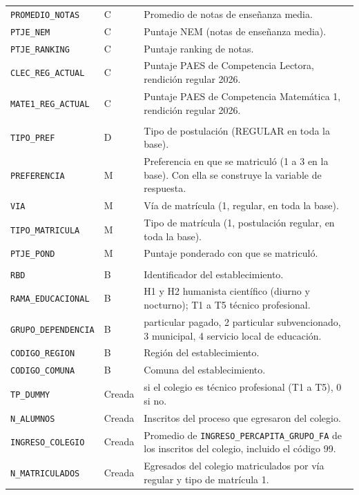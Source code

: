 \documentclass[11pt]{article}
\begin{document}
\begin{longtable}{>{\raggedright\arraybackslash}p{5.4cm}
                  >{\raggedright\arraybackslash}p{1.4cm}
                  >{\raggedright\arraybackslash}p{6.6cm}}
\texttt{PROMEDIO\_NOTAS} & C & Promedio de notas de enseñanza media. \\
\texttt{PTJE\_NEM} & C & Puntaje NEM (notas de enseñanza media). \\
\texttt{PTJE\_RANKING} & C & Puntaje ranking de notas. \\
\texttt{CLEC\_REG\_ACTUAL} & C & Puntaje PAES de Competencia Lectora, rendición regular 2026. \\
\texttt{MATE1\_REG\_ACTUAL} & C & Puntaje PAES de Competencia Matemática 1, rendición regular 2026. \\
\midrule
\multicolumn{3}{l}{\textit{Postulación y matrícula}} \\
\texttt{TIPO\_PREF} & D & Tipo de postulación (REGULAR en toda la base). \\
\texttt{PREFERENCIA} & M & Preferencia en que se matriculó (1 a 3 en la base). Con ella se construye la variable de respuesta. \\
\texttt{VIA} & M & Vía de matrícula (1, regular, en toda la base). \\
\texttt{TIPO\_MATRICULA} & M & Tipo de matrícula (1, postulación regular, en toda la base). \\
\texttt{PTJE\_POND} & M & Puntaje ponderado con que se matriculó. \\
\midrule
\multicolumn{3}{l}{\textit{Colegio de egreso}} \\
\texttt{RBD} & B & Identificador del establecimiento. \\
\texttt{RAMA\_EDUCACIONAL} & B & H1 y H2 humanista científico (diurno y nocturno); T1 a T5 técnico profesional. \\
\texttt{GRUPO\_DEPENDENCIA} & B & 1 particular pagado, 2 particular subvencionado, 3 municipal, 4 servicio local de educación. \\
\texttt{CODIGO\_REGION} & B & Región del establecimiento. \\
\texttt{CODIGO\_COMUNA} & B & Comuna del establecimiento. \\
\texttt{TP\_DUMMY} & Creada & 1 si el colegio es técnico profesional (T1 a T5), 0 si no. \\
\texttt{N\_ALUMNOS} & Creada & Inscritos del proceso que egresaron del colegio. \\
\texttt{INGRESO\_COLEGIO} & Creada & Promedio de \texttt{INGRESO\_PERCAPITA\_GRUPO\_FA} de los inscritos del colegio, incluido el código 99. \\
\texttt{N\_MATRICULADOS} & Creada & Egresados del colegio matriculados por vía regular y tipo de matrícula 1. \\
\end{longtable}
\end{document}

